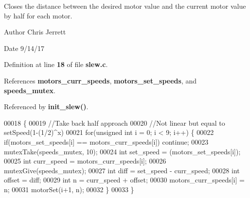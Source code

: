 Closes the distance between the desired motor value and the current motor value by half for each motor. 

\begin{DoxyAuthor}{Author}
Chris Jerrett 
\end{DoxyAuthor}
\begin{DoxyDate}{Date}
9/14/17 
\end{DoxyDate}


Definition at line \textbf{ 18} of file \textbf{ slew.\+c}.



References \textbf{ motors\+\_\+curr\+\_\+speeds}, \textbf{ motors\+\_\+set\+\_\+speeds}, and \textbf{ speeds\+\_\+mutex}.



Referenced by \textbf{ init\+\_\+slew()}.


\begin{DoxyCode}
00018                    \{
00019   \textcolor{comment}{//Take back half approach}
00020   \textcolor{comment}{//Not linear but equal to setSpeed(1-(1/2)^x)}
00021   \textcolor{keywordflow}{for}(\textcolor{keywordtype}{unsigned} \textcolor{keywordtype}{int} i = 0; i < 9; i++) \{
00022     \textcolor{keywordflow}{if}(motors_set_speeds[i] == motors_curr_speeds[i]) \textcolor{keywordflow}{continue};
00023     mutexTake(speeds_mutex, 10);
00024     \textcolor{keywordtype}{int} set\_speed = (motors_set_speeds[i]);
00025     \textcolor{keywordtype}{int} curr\_speed = motors_curr_speeds[i];
00026     mutexGive(speeds_mutex);
00027     \textcolor{keywordtype}{int} diff = set\_speed - curr\_speed;
00028     \textcolor{keywordtype}{int} offset = diff;
00029     \textcolor{keywordtype}{int} n = curr\_speed + offset;
00030     motors_curr_speeds[i] = n;
00031     motorSet(i+1, n);
00032   \}
00033 \}
\end{DoxyCode}
